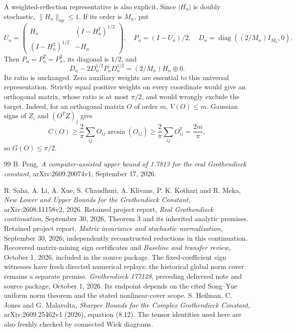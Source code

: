 \documentclass[11pt]{article}
\newcommand{\norm}[1]{\lVert #1\rVert}
\begin{document}
A weighted-reflection representative is also explicit. Since $|H_n|$
is doubly stochastic, $\norm{H_n}_{\mathrm{op}}\le1$. If its order is
$M_n$, put
\[
 U_n=\begin{pmatrix}H_n&(I-H_n^2)^{1/2}\\
                     (I-H_n^2)^{1/2}&-H_n\end{pmatrix},\quad
 P_n=(I-U_n)/2,\quad D_n=\operatorname{diag}((2/M_n)I_{M_n},0).
\]
Then $P_n=P_n^T=P_n^2$, its diagonal is $1/2$, and
\[
 D_n-2D_n^{1/2}P_nD_n^{1/2}=(2/M_n)H_n\oplus0.
\]
Its ratio is unchanged. Zero auxiliary weights are essential to this
universal representation. Strictly equal positive weights on every
coordinate would give an orthogonal matrix, whose ratio is at most
$\pi/2$, and would wrongly exclude the target. Indeed, for an orthogonal matrix $O$ of order $m$, $V(O)\le m$.
Gaussian signs of $Z_i$ and $(O^TZ)_j$ give
\[
 C(O)\ge\frac2\pi\sum_{ij}O_{ij}\arcsin(O_{ij})
 \ge\frac2\pi\sum_{ij}O_{ij}^2=\frac{2m}\pi,
\]
so $G(O)\le\pi/2$.

\begin{thebibliography}{99}
 B. Peng, \emph{A computer-assisted upper bound of 1.7813 for the real Grothendieck constant}, arXiv:2609.20074v1, September 17, 2026.

 R. Saha, A. Li, A. Xue, S. Chaudhuri, A. Klivans,
P. K. Kothari and R. Meka, \emph{New Lower and Upper Bounds for the
Grothendieck Constant}, arXiv:2608.11158v2, 2026.
 Retained project report,
\emph{Real Grothendieck continuation}, September 30, 2026,
Theorem 3 and its inherited analytic premises.
 Retained project report,
\emph{Matrix invariance and stochastic normalization}, September 30,
2026; independently reconstructed reductions in this continuation.
 Recovered matrix-mining sign certificates and
 \emph{Baseline and transfer review}, October 1, 2026, included in the
source package. The fixed-coefficient sign witnesses have fresh directed numerical replays;
the historical global norm cover remains a separate premise.
 \emph{Grothendieck 177128}, preceding delivered
note and source package, October 1, 2026. Its endpoint depends on the
cited Song--Yue uniform norm theorem and the stated nonlinear-cover scope.
 S. Heilman, C. Jones and G. Malavolta,
\emph{Sharper Bounds for the Complex Grothendieck Constant},
arXiv:2609.25462v1 (2026), equation (8.12). The tensor identities used
here are also freshly checked by connected Wick diagrams.
\end{thebibliography}
\end{document}
